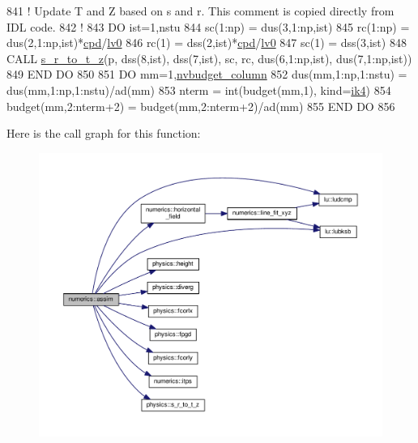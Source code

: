 \begin{DoxyCode}
841 \textcolor{comment}{! Update T and Z based on s and r. This comment is copied directly from IDL code.}
842 \textcolor{comment}{!}
843 \textcolor{keywordflow}{DO} ist=1,nstu
844     sc(1:np)    = dus(3,1:np,ist)
845     rc(1:np)    = dus(2,1:np,ist)*\hyperlink{namespaceconstants_a32354adf3493f59d0fc17b0302b2c368}{cpd}/\hyperlink{namespaceconstants_afb3befdfd57058ee9d073b832134a601}{lv0}
846     rc(1)       = dss(2,ist)*\hyperlink{namespaceconstants_a32354adf3493f59d0fc17b0302b2c368}{cpd}/\hyperlink{namespaceconstants_afb3befdfd57058ee9d073b832134a601}{lv0}
847     sc(1)       = dss(3,ist)
848     \textcolor{keyword}{CALL }\hyperlink{namespacephysics_a3f1959e7b3ff1a8d052f1e0441b1c379}{s\_r\_to\_t\_z}(p, dss(8,ist), dss(7,ist), sc, rc, dus(6,1:np,ist), dus(7,1:np,ist))
849 \textcolor{keywordflow}{END DO}
850 
851 \textcolor{keywordflow}{DO} mm=1,\hyperlink{namespacesettings_a78876a80ce867f4bc71866b783b6de89}{nvbudget\_column}
852     dus(mm,1:np,1:nstu)     = dus(mm,1:np,1:nstu)/ad(mm)
853     nterm   = int(budget(mm,1), kind=\hyperlink{namespaceportable_aa110cf333432508140602ea192c4b2ea}{ik4})
854     budget(mm,2:nterm+2)    = budget(mm,2:nterm+2)/ad(mm)
855 \textcolor{keywordflow}{END DO}
856 
\end{DoxyCode}


Here is the call graph for this function\+:\nopagebreak
\begin{figure}[H]
\begin{center}
\leavevmode
\includegraphics[width=350pt]{namespacenumerics_acc1dd6ef9a4cf200fd7701143c4ae29e_cgraph}
\end{center}
\end{figure}




